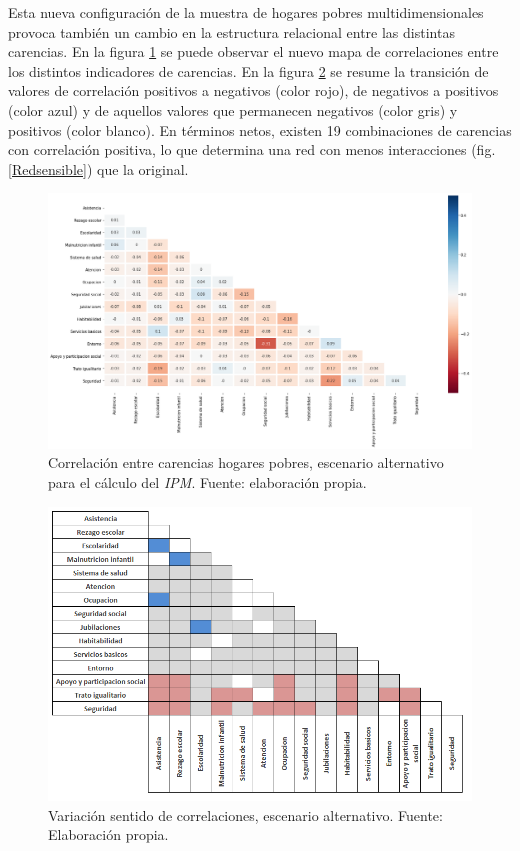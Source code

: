 \documentclass[12pt,letterpaper,spanish]{article}
\begin{document}
Esta nueva configuración de la muestra de hogares pobres multidimensionales provoca también un cambio en la estructura relacional entre las distintas carencias. En la figura \ref{heatmap_sensible} se puede observar el nuevo mapa de correlaciones entre los distintos indicadores de carencias. En la figura \ref{varposneg} se resume la transición de valores de correlación positivos a negativos (color rojo), de negativos a positivos (color azul) y de aquellos valores que permanecen negativos (color gris) y positivos (color blanco). En términos netos, existen 19 combinaciones de carencias con correlación positiva, lo que determina una red con menos interacciones (fig. \ref{Redsensible}) que la original.




\begin{figure}[H]
    \centering
        \includegraphics[width=\textwidth]{Heatmaps/Heatmap_sensibilidad.png}
    \caption{Correlación entre carencias hogares pobres, escenario alternativo para el cálculo del \textit{IPM}. Fuente: elaboración propia.}
    \label{heatmap_sensible}
\end{figure}


\begin{figure}[H]
    \centering
        \includegraphics[width=14cm]{Max/variacion_correlaciones.png}
    \caption{Variación sentido de correlaciones, escenario alternativo. Fuente: Elaboración propia.}
    \label{varposneg}
\end{figure}
\end{document}
